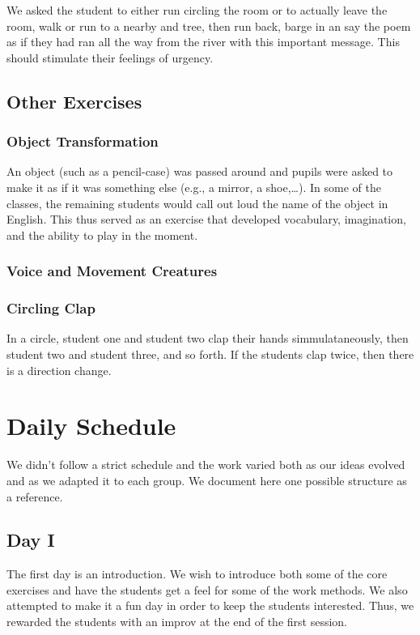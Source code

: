 \documentclass[article,twocolumn,twoside]{memoir}
\begin{document}
We asked the student to either run circling the room or to actually leave the
room, walk or run to a nearby and tree, then run back, barge in an say the poem
as if they had ran all the way from the river with this important message. This
should stimulate their feelings of urgency.

\section{Other Exercises}
\subsection{Object Transformation}
An object (such as a pencil-case) was passed around and pupils were asked to
make it as if it was something else (e.g., a mirror, a shoe,\dots). In some of
the classes, the remaining students would call out loud the name of the object
in English. This thus served as an exercise that developed vocabulary, imagination,
and the ability to play in the moment.

\subsection{Voice and Movement Creatures}
\subsection{Circling Clap}
In a circle, student one and student two clap their hands simmulataneously,
then student two and student three, and so forth. If the students clap twice,
then there is a direction change.

\chapter{Daily Schedule}

We didn't follow a strict schedule and the work varied both as our ideas
evolved and as we adapted it to each group. We document here one possible
structure as a reference.

\section{Day I}
The first day is an introduction. We wish to introduce both some of the core
exercises and have the students get a feel for some of the work methods. We
also attempted to make it a fun day in order to keep the students interested.
Thus, we rewarded the students with an improv at the end of the first session.
\end{document}
